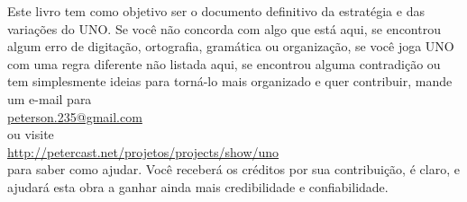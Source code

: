 \documentclass[a5paper,10pt,final,openright]{memoir}
\begin{document}

\newpage

\restoregeometry

\tableofcontents













\newpage


\begin{center}
\begin{small}
Este livro tem como objetivo ser o documento definitivo da estratégia e das variações do UNO. Se você não concorda com algo que está aqui, se encontrou algum erro de digitação, ortografia, gramática ou organização, se você joga UNO com uma regra diferente não listada aqui, se encontrou alguma contradição ou tem simplesmente ideias para torná-lo mais organizado e quer contribuir, mande um e-mail para \\

\href{mailto:peterson.235@gmail.com}{peterson.235@gmail.com} \\

ou visite \\

\url{http://petercast.net/projetos/projects/show/uno} \\

para saber como ajudar. Você receberá os créditos por sua contribuição, é claro, e ajudará esta obra a ganhar ainda mais credibilidade e confiabilidade.
\end{small}
\end{center}

\restoregeometry
\end{document}
